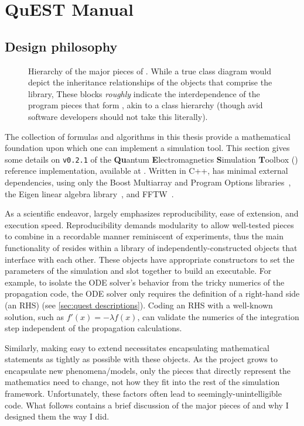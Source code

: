 \chapter{QuEST Manual}

\section{Design philosophy}

\begin{figure}
  \centering
  \caption{\label{fig:hierarchy}Hierarchy of the major pieces of \QuEST{}.
    While a true class diagram would depict the inheritance relationships of the objects that comprise the \QuEST{} library, 
  These blocks \emph{roughly} indicate the interdependence of the program pieces that form \QuEST{}, akin to a class hierarchy (though avid software developers should not take this literally).}
\end{figure}

The collection of formulas and algorithms in this thesis provide a mathematical foundation upon which one can implement a simulation tool. This section gives some details on \texttt{v0.2.1} of the \textbf{Qu}antum \textbf{E}lectromagnetics \textbf{S}imulation \textbf{T}oolbox (\QuEST{}) reference implementation, available at \cite{QuESTimpl}. Written in C++, \QuEST{} has minimal external dependencies, using only the Boost Multiarray and Program Options libraries~\cite{boost}, the Eigen linear algebra library~\cite{eigen}, and FFTW~\cite{FFTW}.

As a scientific endeavor, \QuEST{} largely emphasizes reproducibility, ease of extension, and execution speed.
Reproducibility demands modularity to allow well-tested pieces to combine in a recordable manner reminiscent of experiments, thus the main functionality of \QuEST{} resides within a library of independently-constructed objects that interface with each other.
These objects have appropriate constructors to set the parameters of the simulation and slot together to build an executable.
For example, to isolate the ODE solver's behavior from the tricky numerics of the propagation code, the ODE solver only requires the definition of a right-hand side (an RHS) (see \cref{sec:quest descriptions}).
Coding an RHS with a well-known solution, such as $f'(x) = - \lambda f(x)$, can validate the numerics of the integration step independent of the propagation calculations.

Similarly, making \QuEST{} easy to extend necessitates encapsulating mathematical statements as tightly as possible with these objects.
As the project grows to encapsulate new phenomena/models, only the pieces that directly represent the mathematics need to change, not how they fit into the rest of the simulation framework.
Unfortunately, these factors often lead to seemingly-unintelligible code. What follows contains a brief discussion of the major pieces of \QuEST{} and why I designed them the way I did.

